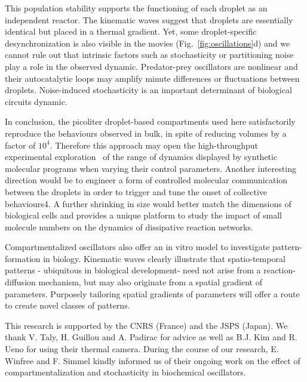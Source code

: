 \documentclass[prl,aps,reprint,
 amsmath,amssymb,superscriptaddress]{revtex4-1}
\begin{document}
This population stability supports the functioning of each droplet as an independent reactor. The kinematic waves suggest that droplets are essentially identical but placed in a thermal gradient. Yet, some droplet-specific desynchronization is also visible in the movies (Fig.~\ref{fig:oscillations}d) and we cannot rule out that intrinsic factors such as stochasticity or partitioning noise play a role in the observed dynamic. Predator-prey oscillators are nonlinear and their autocatalytic loops may amplify minute differences or fluctuations between droplets. Noise-induced stochasticity is an important determinant of biological circuits dynamic.

	In conclusion, the picoliter droplet-based compartments used here satisfactorily reproduce the behaviours observed in bulk, in spite of reducing volumes by a factor of $10^4$.  Therefore this approach may open the high-throughput experimental exploration~\cite{Pompano2011} of the range of dynamics displayed by synthetic molecular programs when varying their control parameters. Another interesting direction would be to engineer a form of controlled molecular communication between the droplets in order to trigger and tune the onset of collective behaviours4.  A further shrinking in size would better match the dimensions of biological cells and provides a unique platform to study the impact of small molecule numbers on the dynamics of dissipative reaction networks. 
	
	Compartmentalized oscillators also offer an in vitro model to investigate pattern-formation in biology. Kinematic waves clearly illustrate that spatio-temporal patterns - ubiquitous in biological development- need not arise from a reaction-diffusion mechanism, but may also originate from a spatial gradient of parameters. Purposely tailoring spatial gradients of parameters will offer a route to create novel classes of patterns.
	
\begin{acknowledgments}
	This research is supported by the CNRS (France) and the JSPS (Japan). We thank V. Taly, H. Guillou and A. Padirac for advice as well as B.J. Kim and R. Ueno for using their thermal camera. During the course of our research, E. Winfree and F. Simmel kindly informed us of their ongoing work on the effect of compartmentalization and stochasticity in biochemical oscillators.
\end{acknowledgments}



\end{document}

